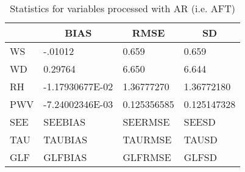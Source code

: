 \documentclass[11pt,english]{article}
\begin{document}
\begin{table}[]
\begin{center}
\begin{tabular}{|l|l|l|l|}
\hline
                            & \multicolumn{1}{c|}{\cellcolor[HTML]{C0C0C0}\textbf{BIAS}} & \multicolumn{1}{c|}{\cellcolor[HTML]{C0C0C0}\textbf{RMSE}} & \multicolumn{1}{c|}{\cellcolor[HTML]{C0C0C0}\textbf{SD}} \\\hline
\cellcolor[HTML]{C0C0C0}WS  &   -.01012                                &     0.659                                &     0.659                                \\
\cellcolor[HTML]{C0C0C0}WD  &   0.29764                                &     6.650                                &     6.644                                \\
\cellcolor[HTML]{C0C0C0}RH  &   -1.17930677E-02                                &    1.36777270                                    &    1.36772180                                    \\
\cellcolor[HTML]{C0C0C0}PWV &   -7.24002346E-03                               &   0.125356585                                   &   0.125147328                                   \\
\cellcolor[HTML]{C0C0C0}SEE & SEEBIAS                               & SEERMSE                               & SEESD                               \\
\cellcolor[HTML]{C0C0C0}TAU & TAUBIAS                               & TAURMSE                               & TAUSD                               \\
\cellcolor[HTML]{C0C0C0}GLF & GLFBIAS                               & GLFRMSE                               & GLFSD                               \\
\hline
\end{tabular}
\caption{Statistics for variables processed with AR (i.e. AFT)}
\end{center}
\end{table}
\clearpage
\end{document}
